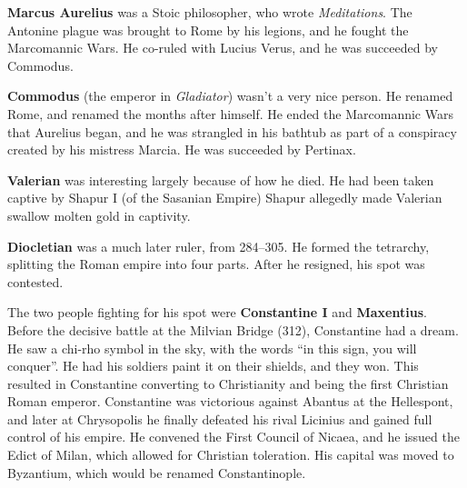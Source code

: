 \textbf{Marcus Aurelius} was a Stoic philosopher, who wrote \textit{Meditations}.
The Antonine plague was brought to Rome by his legions,
and he fought the Marcomannic Wars.
He co-ruled with Lucius Verus, and he was succeeded by Commodus.

\textbf{Commodus} (the emperor in \textit{Gladiator}) wasn't a very nice person.
He renamed Rome, and renamed the months after himself.
He ended the Marcomannic Wars that Aurelius began, and he was strangled in his bathtub
as part of a conspiracy created by his mistress Marcia.
He was succeeded by Pertinax.

\textbf{Valerian} was interesting largely because of how he died.
He had been taken captive by Shapur I (of the Sasanian Empire)
Shapur allegedly made Valerian swallow molten gold in captivity.

\textbf{Diocletian} was a much later ruler, from 284--305.
He formed the tetrarchy, splitting the Roman empire into four parts.
After he resigned, his spot was contested.

The two people fighting for his spot were \textbf{Constantine I} and \textbf{Maxentius}.
Before the decisive battle at the Milvian Bridge (312), Constantine had a dream.
He saw a chi-rho symbol in the sky, with the words ``in this sign, you will conquer''.
He had his soldiers paint it on their shields, and they won.
This resulted in Constantine converting to Christianity and being the first Christian Roman emperor.
Constantine was victorious against Abantus at the Hellespont,
and later at Chrysopolis he finally defeated his rival Licinius and gained full control of his empire.
He convened the First Council of Nicaea, and he issued the Edict of Milan,
which allowed for Christian toleration.
His capital was moved to Byzantium, which would be renamed Constantinople.
